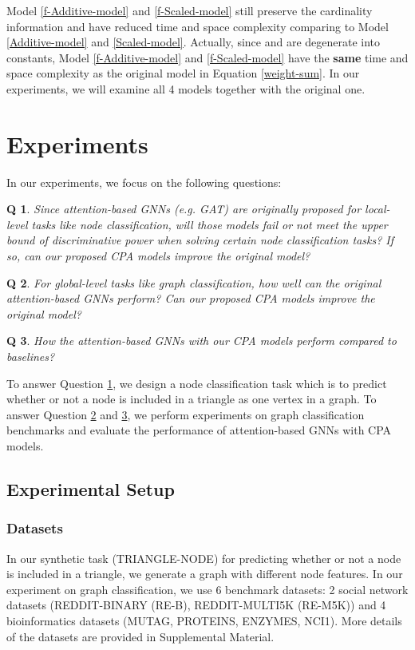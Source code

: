 \documentclass[letterpaper]{article} \usepackage{aaai20}  \usepackage{times}  \usepackage{helvet} \usepackage{courier}  \usepackage[hyphens]{url}  \usepackage{graphicx} \urlstyle{rm} \def\UrlFont{\rm}  \usepackage{graphicx}  \frenchspacing  \setlength{\pdfpagewidth}{8.5in}  \setlength{\pdfpageheight}{11in}
\theoremstyle{plain}
\newtheorem{question}{Q}
\theoremstyle{definition}
\begin{document}
Model \ref{f-Additive-model} and \ref{f-Scaled-model} still preserve the cardinality information and have reduced time and space complexity comparing to Model \ref{Additive-model} and \ref{Scaled-model}. Actually, since  and  are degenerate into constants, Model \ref{f-Additive-model} and \ref{f-Scaled-model} have the \textbf {same} time and space complexity as the original model in Equation \ref{weight-sum}. In our experiments, we will examine all 4 models together with the original one.

\section{Experiments}
In our experiments, we focus on the following questions:

\begin{question} \label{Q3}
Since attention-based GNNs (e.g. GAT) are originally proposed for local-level tasks like node classification, will those models fail or not meet the upper bound of discriminative power when solving certain node classification tasks? If so, can our proposed CPA models improve the original model?
\end{question}

\begin{question} \label{Q4}
For global-level tasks like graph classification, how well can the original attention-based GNNs perform? Can our proposed CPA models improve the original model?
\end{question}

\begin{question} \label{Q5}
How the attention-based GNNs with our CPA models perform compared to baselines?
\end{question}

To answer Question \ref{Q3}, we design a node classification task which is to predict whether or not a node is included in a triangle as one vertex in a graph. To answer Question \ref{Q4} and \ref{Q5}, we perform experiments on graph classification benchmarks and evaluate the performance of attention-based GNNs with CPA models.

\subsection{Experimental Setup}

\subsubsection{Datasets}
In our synthetic task (TRIANGLE-NODE) for predicting whether or not a node is included in a triangle, we generate a graph with different node features. In our experiment on graph classification, we use 6 benchmark datasets: 2 social network datasets (REDDIT-BINARY (RE-B), REDDIT-MULTI5K (RE-M5K)) and 4 bioinformatics datasets (MUTAG, PROTEINS, ENZYMES, NCI1). More details of the datasets are provided in Supplemental Material. 
\end{document}

